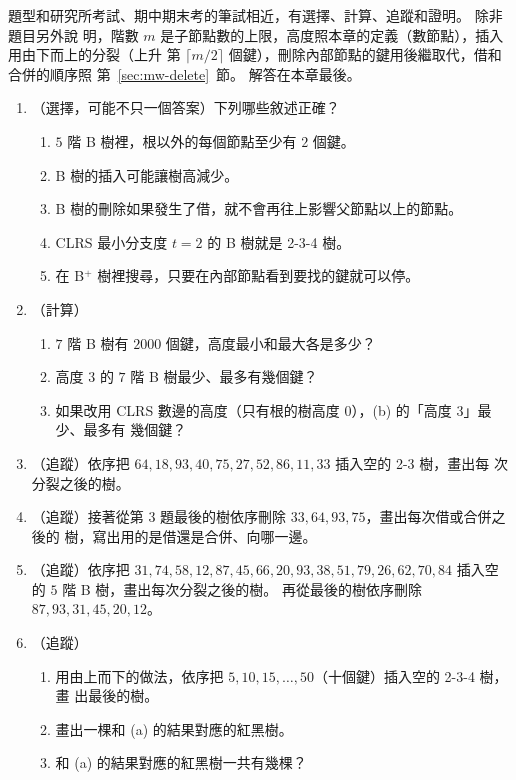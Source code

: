 題型和研究所考試、期中期末考的筆試相近，有選擇、計算、追蹤和證明。 除非題目另外說
明，階數 $m$ 是子節點數的上限，高度照本章的定義（數節點），插入用由下而上的分裂（上升
第 $\lceil m/2 \rceil$ 個鍵），刪除內部節點的鍵用後繼取代，借和合併的順序照
第~\ref{sec:mw-delete}~節。 解答在本章最後。

\begin{enumerate}
\item （選擇，可能不只一個答案）下列哪些敘述正確？
\begin{enumerate}
\item $5$ 階 B 樹裡，根以外的每個節點至少有 $2$ 個鍵。
\item B 樹的插入可能讓樹高減少。
\item B 樹的刪除如果發生了借，就不會再往上影響父節點以上的節點。
\item CLRS 最小分支度 $t = 2$ 的 B 樹就是 2-3-4 樹。
\item 在 B$^{+}$ 樹裡搜尋，只要在內部節點看到要找的鍵就可以停。
\end{enumerate}

\item （計算）
\begin{enumerate}
\item $7$ 階 B 樹有 $2000$ 個鍵，高度最小和最大各是多少？
\item 高度 $3$ 的 $7$ 階 B 樹最少、最多有幾個鍵？
\item 如果改用 CLRS 數邊的高度（只有根的樹高度 $0$），(b) 的「高度 $3$」最少、最多有
幾個鍵？
\end{enumerate}

\item （追蹤）依序把 $64, 18, 93, 40, 75, 27, 52, 86, 11, 33$ 插入空的 2-3 樹，畫出每
次分裂之後的樹。

\item （追蹤）接著從第 3 題最後的樹依序刪除 $33, 64, 93, 75$，畫出每次借或合併之後的
樹，寫出用的是借還是合併、向哪一邊。

\item （追蹤）依序把 $31, 74, 58, 12, 87, 45, 66, 20, 93, 38, 51, 79, 26, 62, 70, 84$
插入空的 $5$ 階 B 樹，畫出每次分裂之後的樹。 再從最後的樹依序刪除
$87, 93, 31, 45, 20, 12$。

\item （追蹤）
\begin{enumerate}
\item 用由上而下的做法，依序把 $5, 10, 15, \ldots, 50$（十個鍵）插入空的 2-3-4 樹，畫
出最後的樹。
\item 畫出一棵和 (a) 的結果對應的紅黑樹。
\item 和 (a) 的結果對應的紅黑樹一共有幾棵？
\end{enumerate}


\end{enumerate}
